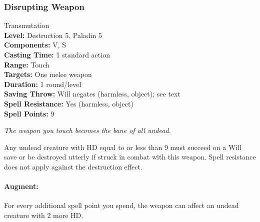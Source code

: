 % 
\subsubsection{Disrupting Weapon}
\label{Spell:DisruptingWeapon}
Transmutation
\\ \textbf{Level:} Destruction 5, Paladin 5
\\ \textbf{Components:} V, S
\\ \textbf{Casting Time:} 1 standard action
\\ \textbf{Range:} Touch
\\ \textbf{Targets:} One melee weapon
\\ \textbf{Duration:} 1 round/level
\\ \textbf{Saving Throw:} Will negates (harmless, object); see text
\\ \textbf{Spell Resistance:} Yes (harmless, object)
\\ \textbf{Spell Points:} 9

\emph{The weapon you touch becomes the bane of all undead.} 

Any undead creature with HD equal to or less than 9 must succeed on a Will save or be destroyed utterly if struck in combat with this weapon. 
Spell resistance does not apply against the destruction effect.

\paragraph{Augment:} For every additional spell point you spend, the weapon can affect an undead creature with 2 more HD.
